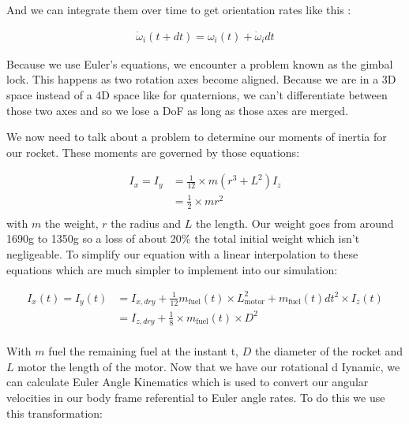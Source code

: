 And we can integrate them over time to get orientation rates like this :

\begin{gather*}
    \dot{\omega}_i(t + dt) = \omega_i(t) + \dot{\omega}_i dt
\end{gather*}

Because we use Euler's equations, we encounter a problem known as the gimbal
lock. This happens as two rotation axes become aligned. Because we are in a 3D
space instead of a 4D space like for quaternions, we can't differentiate
between those two axes and so we lose a DoF as long as those axes are merged.

We now need to talk about a problem to determine our moments of inertia for our rocket.
These moments are governed by those equations:

\begin{align*}
    I_x = I_y & = \frac{1}{12} \times m(r^3 + L^2)I_z \\
              & = \frac{1}{2} \times mr^2             \\
\end{align*}
with $m$ the weight, $r$ the radius and $L$ the length.
Our weight goes from around 1690g to 1350g so a loss of about 20\% the total initial
weight which isn't negligeable. To simplify our equation with a linear interpolation
to these equations which are much simpler to implement into our simulation:

\begin{align*}
    I_x(t) = I_y(t) & = I_{x, dry} + \frac{1}{12}m_{\text{fuel}}(t) \times L^2_{\text{motor}} + m_{\text{fuel}}(t)dt^2 \times I_z(t) \\
                    & = I_{z, dry} + \frac{1}{8} \times m_{\text{fuel}}(t) \times D^2                                                \\
\end{align*}

With $m$ fuel the remaining fuel at the instant t, $D$ the diameter of the rocket and $L$
motor the length of the motor. Now that we have our rotational d Iynamic, we can calculate
Euler Angle Kinematics which is used to convert our angular velocities in our body frame
referential to Euler angle rates. To do this we use this transformation:

